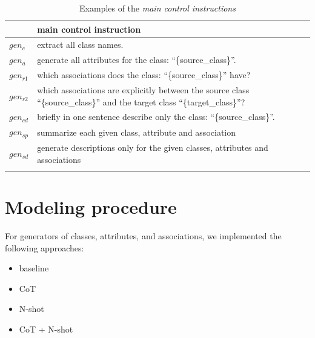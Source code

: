 \begin{table}[!h]
    \scriptsize
    \centering
    \setlength{\tabcolsep}{0.5em}
\begin{tabular}{@{}l>{\raggedright\arraybackslash}p{}>{\raggedright\arraybackslash}p{}@{}}
         & main control instruction \\
    \toprule
    \addlinespace
    
$gen_c$ & extract all class names. \\
\addlinespace

$gen_a$ & generate all attributes for the class: ``\{source\_class\}''. \\
\addlinespace

$gen_{r1}$ & which associations does the class: ``\{source\_class\}'' have? \\
\addlinespace

$gen_{r2}$ & which associations are explicitly between the source class ``\{source\_class\}'' and the target class ``\{target\_class\}''? \\
\addlinespace

$gen_{cd}$ & briefly in one sentence describe only the class: ``\{source\_class\}''. \\
\addlinespace

$gen_{sp}$ & summarize each given class, attribute and association \\
\addlinespace

$gen_{sd}$ & generate descriptions only for the given classes, attributes and associations \\
\addlinespace

	\bottomrule
	\addlinespace
	\end{tabular}
	\caption{Examples of the \emph{main control instructions}}
	\label{tab:main_control_instructions}
\end{table}


\section{Modeling procedure}

For generators of classes, attributes, and associations, we implemented the following approaches:

\begin{itemize}
\item baseline
\item CoT
\item N-shot
\item CoT + N-shot
\end{itemize}

